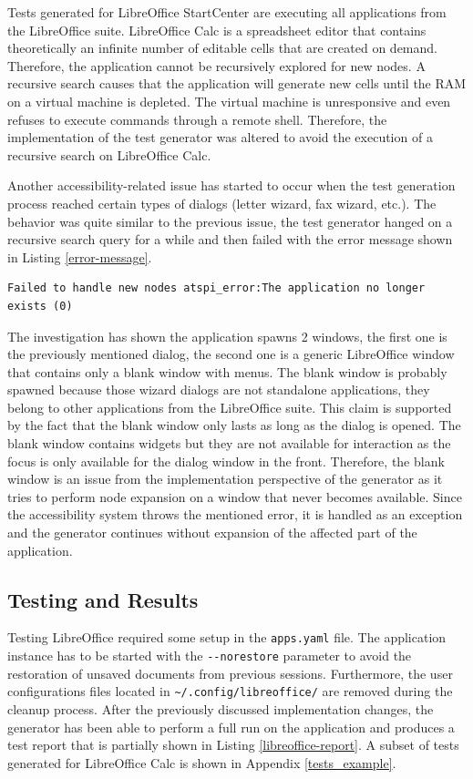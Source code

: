 Tests generated for LibreOffice StartCenter are executing all applications from the LibreOffice suite. LibreOffice Calc is a spreadsheet editor that contains theoretically an infinite number of editable cells that are created on demand. Therefore, the application cannot be recursively explored for new nodes. A recursive search causes that the application will generate new cells until the RAM on a virtual machine is depleted. The virtual machine is unresponsive and even refuses to execute commands through a remote shell. Therefore, the implementation of the test generator was altered to avoid the execution of a recursive search on LibreOffice Calc.

Another accessibility-related issue has started to occur when the test generation process reached certain types of dialogs (letter wizard, fax wizard, etc.). The behavior was quite similar to the previous issue, the test generator hanged on a recursive search query for a while and then failed with the error message shown in Listing \ref{error-message}.

\begin{lstlisting}[caption={The error that prevents the generator from node expansion},label={error-message}]
Failed to handle new nodes atspi_error:The application no longer exists (0)
\end{lstlisting}

 The investigation has shown the application spawns 2 windows, the first one is the previously mentioned dialog, the second one is a generic LibreOffice window that contains only a blank window with menus. The blank window is probably spawned because those wizard dialogs are not standalone applications, they belong to other applications from the LibreOffice suite. This claim is supported by the fact that the blank window only lasts as long as the dialog is opened. The blank window contains widgets but they are not available for interaction as the focus is only available for the dialog window in the front. Therefore, the blank window is an issue from the implementation perspective of the generator as it tries to perform node expansion on a window that never becomes available. Since the accessibility system throws the mentioned error, it is handled as an exception and the generator continues without expansion of the affected part of the application.

\subsection*{Testing and Results}\label{libreoffice-test}
Testing LibreOffice required some setup in the \texttt{apps.yaml} file. The application instance has to be started with the \texttt{-{}-norestore} parameter to avoid the restoration of unsaved documents from previous sessions. Furthermore, the user configurations files located in \texttt{\textasciitilde/.config/libreoffice/} are removed during the cleanup process. After the previously discussed implementation changes, the generator has been able to perform a full run on the application and produces a test report that is partially shown in Listing \ref{libreoffice-report}. A subset of tests generated for LibreOffice Calc is shown in Appendix \ref{tests_example}.


